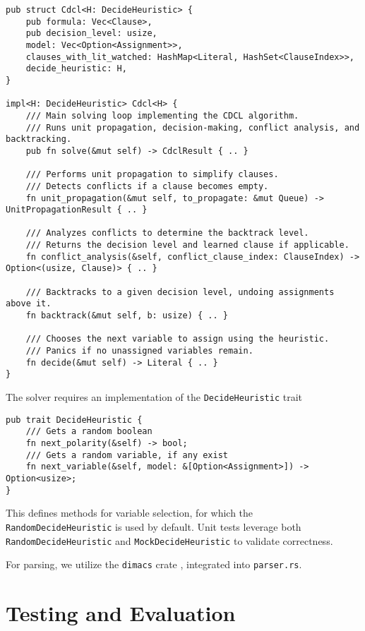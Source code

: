 \documentclass[a4paper,12pt]{article}
\begin{document}
\begin{verbatim}
pub struct Cdcl<H: DecideHeuristic> {
    pub formula: Vec<Clause>,
    pub decision_level: usize,
    model: Vec<Option<Assignment>>,
    clauses_with_lit_watched: HashMap<Literal, HashSet<ClauseIndex>>,
    decide_heuristic: H,
}

impl<H: DecideHeuristic> Cdcl<H> {
    /// Main solving loop implementing the CDCL algorithm.
    /// Runs unit propagation, decision-making, conflict analysis, and backtracking.
    pub fn solve(&mut self) -> CdclResult { .. }

    /// Performs unit propagation to simplify clauses.
    /// Detects conflicts if a clause becomes empty.
    fn unit_propagation(&mut self, to_propagate: &mut Queue) -> UnitPropagationResult { .. }

    /// Analyzes conflicts to determine the backtrack level.
    /// Returns the decision level and learned clause if applicable.
    fn conflict_analysis(&self, conflict_clause_index: ClauseIndex) -> Option<(usize, Clause)> { .. }

    /// Backtracks to a given decision level, undoing assignments above it.
    fn backtrack(&mut self, b: usize) { .. }

    /// Chooses the next variable to assign using the heuristic.
    /// Panics if no unassigned variables remain.
    fn decide(&mut self) -> Literal { .. }
}
\end{verbatim}

The solver requires an implementation of the \texttt{DecideHeuristic} trait

\begin{verbatim}
pub trait DecideHeuristic {
    /// Gets a random boolean
    fn next_polarity(&self) -> bool;
    /// Gets a random variable, if any exist
    fn next_variable(&self, model: &[Option<Assignment>]) -> Option<usize>;
}
\end{verbatim}
This defines methods for variable selection, for which the \texttt{RandomDecideHeuristic} is used by default.
Unit tests leverage both \texttt{RandomDecideHeuristic} and \texttt{MockDecideHeuristic} to validate correctness.

For parsing, we utilize the \texttt{dimacs} crate \cite{DimacsCrate}, integrated into \texttt{parser.rs}.

\section{Testing and Evaluation}
\end{document}

